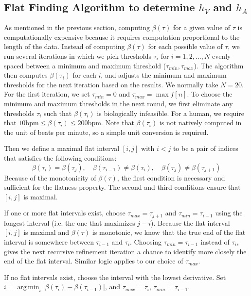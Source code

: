 \documentclass[conference]{IEEEtran}
\newcommand{\APH}{\ensuremath{h_A}}
\newcommand{\VPH}{\ensuremath{h_V}}
\DeclareMathOperator*{\argmin}{arg\,min}
\begin{document}
\subsection{Flat Finding Algorithm to determine \VPH{} and \APH{}}
As mentioned in the previous section, computing $\beta(\tau)$ for a given value of $\tau$
is computationally expensive because it requires computation proportional to the length of the data.
Instead of computing $\beta(\tau)$ for each possible value of $\tau$, we run several iterations in which
we pick thresholds $\tau_i$ for $i = 1, 2, \dots, N$ evenly spaced
between a minimum and maximum threshold ($\tau_{min}, \tau_{max}$).  The algorithm then computes
$\beta(\tau_i)$ for each $i$, and adjusts the minimum and
maximum thresholds for the next iteration based on the
results.
We normally take $N=20$.
For the first iteration, we set
$\tau_{min} = 0$ and $\tau_{max} = \max f[n]$. 
To choose the minimum and maximum thresholds in
the next round, we first eliminate any thresholds $\tau_i$
such that $\beta(\tau_i)$ is biologically infeasible. 
For a human, we require that $10 \text{bpm} \le \beta(\tau_i) \le 200 \text{bpm}$.
Note that $\beta(\tau_i)$ is not natively computed in the unit of beats per minute, so a simple unit conversion is required.

Then we define a maximal flat interval $[i,j]$ with $i<j$ to be a pair of indices that satisfies the following conditions:
\begin{equation*}
	\beta(\tau_i) = \beta(\tau_j),\quad \beta(\tau_{i-1}) \ne \beta(\tau_i),\quad \beta(\tau_j) \ne \beta(\tau_{j+1})
\end{equation*}
Because of the monotonicity of $\beta(\tau)$, the first condition is necessary and sufficient for the flatness property.
The second and third conditions ensure that $[i,j]$ is maximal.

If one or more flat intervals exist, choose $\tau_{max} = \tau_{j+1}$ and $\tau_{min}=\tau_{i-1}$ using the longest interval (i.e. the one that maximizes $j-i$).
Because the flat interval $[i,j]$ is maximal and $\beta(\tau)$ is monotonic,
we know that the true end of the flat interval is somewhere between $\tau_{i-1}$ and $\tau_i$. 
Choosing $\tau_{min} = \tau_{i-1}$ instead of $\tau_{i}$, gives the next recursive refinement iteration a chance to identify more closely the end of the flat interval.
Similar logic applies to our choice of $\tau_{max}$.

If no flat intervals exist, choose the interval with the lowest derivative.
Set $i=\argmin_{i} |\beta(\tau_i) - \beta(\tau_{i-1})|$, and  $\tau_{max} = \tau_i$, $\tau_{min} = \tau_{i-1}$.
\end{document}
